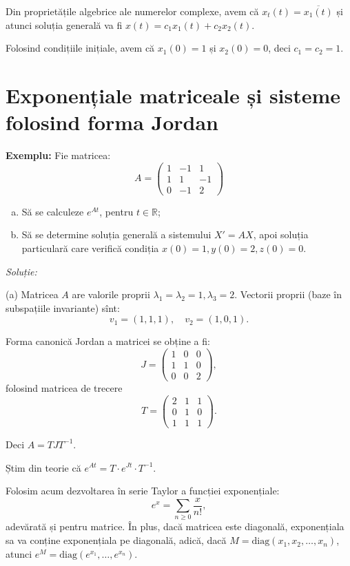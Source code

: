 \documentclass[11pt,a4paper]{article}
\newcommand\RR{\mathbb{R}}
\theoremstyle{dotless}
\theoremstyle{dotlessdr}
\begin{document}
Din proprietățile algebrice ale numerelor complexe, avem că $x_t(t) = \overline{x_1(t)}$ și atunci
soluția generală va fi $x(t) = c_1 x_1(t) + c_2 x_2(t)$.

Folosind condițiile inițiale, avem că $x_1(0) = 1$ și $x_2(0) = 0$, deci $c_1 = c_2 = 1$.


\section{Exponențiale matriceale și sisteme folosind forma Jordan}
\label{sec:jordan}

\textbf{Exemplu:} Fie matricea:
\[
  A = \begin{pmatrix}
    1 & -1 & 1 \\
    1 & 1 & -1 \\
    0 & -1 & 2 
  \end{pmatrix}
\]
\begin{enumerate}[(a)]
\item Să se calculeze $e^{At}$, pentru $t \in \RR$;
\item Să se determine soluția generală a sistemului $X' = AX$, apoi soluția particulară
  care verifică condiția $x(0) = 1, y(0) = 2, z(0) = 0$.
\end{enumerate}

\emph{Soluție:}

(a) Matricea $A$ are valorile proprii $\lambda_1 = \lambda_2 = 1, \lambda_3 = 2$.
Vectorii proprii (baze în subspațiile invariante) sînt:
\[
  v_1 = (1, 1, 1), \quad v_2 = (1, 0, 1).
\]

Forma canonică Jordan a matricei se obține a fi:
\[
  J = \begin{pmatrix}
    1 & 0 & 0 \\
    1 & 1 & 0 \\
    0 & 0 & 2
  \end{pmatrix},
\]
folosind matricea de trecere
\[
  T = \begin{pmatrix}
    2 & 1 & 1 \\ 0 & 1 & 0 \\ 1 & 1 & 1
  \end{pmatrix}.
\]

Deci $A = TJT^{-1}$.

Știm din teorie că $e^{At} = T \cdot e^{Jt} \cdot T^{-1}$.

Folosim acum dezvoltarea în serie Taylor a funcției exponențiale:
\[
  e^x = \sum_{n \geq 0} \frac{x}{n!},
\]
adevărată și pentru matrice. În plus, dacă matricea este diagonală,
exponențiala sa va conține ex\-po\-nen\-ți\-a\-la pe diagonală, adică, dacă
$M = \mathrm{diag}(x_1, x_2, \dots, x_n)$, atunci
$e^M = \mathrm{diag}(e^{x_1},\dots, e^{x_n})$.
\end{document}

